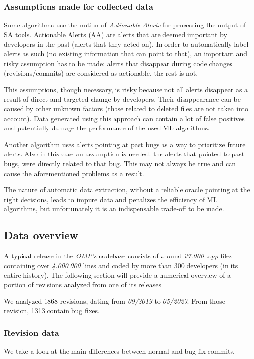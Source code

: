 \subsubsection{Assumptions made for collected data}
Some algorithms use the notion of \textit{Actionable Alerts} for processing the output of SA tools. Actionable Alerts (AA) are alerts that are deemed important by developers in the past (alerts that they acted on). In order to automatically label alerts as such (no existing information that can point to that), an important and risky assumption has to be made: alerts that disappear during code changes (revisions/commits) are considered as actionable, the rest is not. 

This assumptions, though necessary, is risky because not all alerts disappear as a result of direct and targeted change by developers. Their disappearance can be caused by other unknown factors (those related to deleted files are not taken into account). Data generated using this approach can contain a lot of false positives and potentially damage the performance of the used ML algorithms.

Another algorithm uses alerts pointing at past bugs as a way to prioritize future alerts. Also in this case an assumption is needed: the alerts that pointed to past bugs, were directly related to that bug. This may not always be true and can cause the aforementioned problems as a result.

The nature of automatic data extraction, without a reliable oracle pointing at the right decisions, leads to impure data and penalizes the efficiency of ML algorithms, but unfortunately it is an indispensable trade-off to be made.

\subsection{Data overview}

A typical release in the \textit{OMP's} codebase consists of around \textit{27.000} \textit{.cpp} files containing over \textit{4.000.000} lines and coded by more than 300 developers (in its entire history). The following section will provide a numerical overview of a portion of revisions analyzed from one of its releases 

We analyzed 1868 revisions, dating from \textit{09/2019} to \textit{05/2020}. From those revision, 1313 contain bug fixes. 

\subsubsection{Revision data}
We take a look at the main differences between normal and bug-fix commits.


